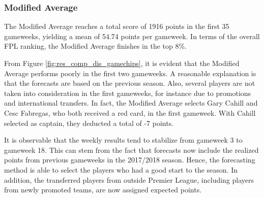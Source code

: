  

\subsubsection{Modified Average}
The Modified Average reaches a total score of 1916 points in the first 35 gameweeks, yielding a mean of 54.74 points per gameweek. In terms of the overall FPL ranking, the Modified Average finishes in the top 8\%.

\newpar

From Figure \ref{fig:res_comp_dis_gamechips}, it is evident that the Modified Average performs poorly in the first two gameweeks. A reasonable explanation is that the forecasts are based on the previous season. Also, several players are not taken into consideration in the first gameweeks, for instance due to promotions and international transfers. In fact, the Modified Average selects Gary Cahill and Cesc Fabregas, who both received a red card, in the first gameweek. With Cahill selected as captain, they deducted a total of -7 points.

\newpar

It is observable that the weekly results tend to stabilize from gameweek 3 to gameweek 18. This can stem from the fact that forecasts now include the realized points from previous gameweeks in the 2017/2018 season. Hence, the forecasting method is able to select the players who had a good start to the season. In addition, the transferred players from outside Premier League, including players from newly promoted teams, are now assigned expected points.


